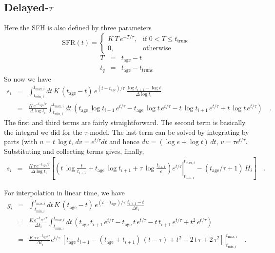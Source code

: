 \documentclass[12pt, letterpaper, preprint]{aastex}
\newcommand{\tmin}[1][]{t_{\mathrm{min} #1}}
\newcommand{\tmax}[1][]{t_{\mathrm{max} #1}}
\newcommand{\dlt}{\Delta\log t_i}
\newcommand{\dt}{\Delta t_i}
\newcommand{\tintegral}{\int_{\tmin[,i]}^{\tmax[,i]} dt}
\newcommand{\tinterval}{\right|_{\tmin[,i]}^{\tmax[,i]}}
\newcommand{\tage}{t_{\mathrm{age}}}
\begin{document}
\subsection{Delayed-$\tau$}
Here the SFH is also defined by three parameters
\[ 
\mathrm{SFR}(t) = 
\begin{cases}
K \, T \, e^{-T/\tau}, &  \text{if } 0 < T \leq t_{\mathrm{trunc}} \\
0, & \text{otherwise}
\end{cases}
\]
\begin{eqnarray}
T & = & \tage - t \nonumber \\
t_q & = & \tage - t_{\mathrm{trunc}} \nonumber
\end{eqnarray}
So now we have
\begin{eqnarray}
s_i  & = & \tintegral \, K \, (\tage-t) \, e^{(t-\tage) /\tau}\, \frac{\log t_{i+1} - \log t}{\dlt}  \nonumber \\
      & = & \frac{K \, e^{-\tage/\tau}}{\dlt} \tintegral \, \left(\tage \, \log t_{i+1} \, e^{t/\tau}  - \tage \, \log t \, e^{t/\tau} - t \, \log t_{i+1} \, e^{t/\tau} + t \, \log t \, e^{t/\tau}\right) \quad .\nonumber
\end{eqnarray}
The first and third terms are fairly straightforward.  The second term is basically the integral we did for the $\tau$-model.  The last term can be solved by integrating by parts (with $u=t\,\log t$, $dv=e^{t/\tau}dt$ and hence $du=(\log e + \log t)\, dt$, $v=\tau e^{t/\tau}$.  Substituting and collecting terms gives, finally, 
\begin{eqnarray}
s_i  & = & \frac{K \, \tau \,  e^{-\tage/\tau}}{\dlt} \left[\left.\left(t\,\log \frac{t}{t_{i+1}} + \tage\,\log t_{i+1}  + \tau\,\log \frac{t_{i+1}}{e}\right) e^{t/\tau}\tinterval - (\tage/\tau+1)\, H_i\right] \quad .
\end{eqnarray}

For interpolation in linear time, we have
\begin{eqnarray}
g_i  & = & \tintegral \, K \, (\tage-t) \, e^{(t-\tage) /\tau}\, \frac{t_{i+1} - t}{\dt}  \nonumber \\
      & = & \frac{K \, e^{-\tage/\tau}}{\dt} \tintegral \, \left(\tage \, t_{i+1} \, e^{t/\tau}  - \tage \, t \, e^{t/\tau} - t \,  t_{i+1} \, e^{t/\tau} + t^2 \, e^{t/\tau}\right) \nonumber \\
     & = & \frac{K \, \tau \, e^{-\tage/\tau}}{\dt} \left. e^{t/\tau} \, \left[ \tage \, t_{i+1} - (\tage + t_{i+1})\, (t-\tau) + t^2 - 2\, t\, \tau + 2\, \tau^2\right] \tinterval \quad .
\end{eqnarray}
\end{document}
